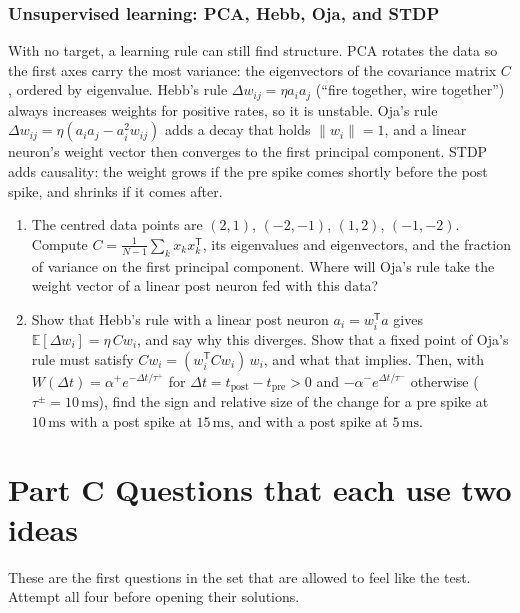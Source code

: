 \documentclass[11pt,letterpaper]{article}
\newcommand{\T}{\mathsf{T}}
\begin{document}
\section{Unsupervised learning: PCA, Hebb, Oja, and STDP}

\begin{idea}
With no target, a learning rule can still find structure. PCA rotates the data so the first axes carry the most variance: the eigenvectors of the covariance matrix $C$, ordered by eigenvalue. Hebb's rule $\Delta w_{ij} = \eta a_ia_j$ (``fire together, wire together'') always increases weights for positive rates, so it is unstable. Oja's rule $\Delta w_{ij} = \eta(a_ia_j - a_i^2 w_{ij})$ adds a decay that holds $\|w_i\| = 1$, and a linear neuron's weight vector then converges to the first principal component. STDP adds causality: the weight grows if the pre spike comes shortly before the post spike, and shrinks if it comes after.
\end{idea}

\begin{enumerate}
\item The centred data points are $(2, 1)$, $(-2, -1)$, $(1, 2)$, $(-1, -2)$. Compute $C = \frac{1}{N - 1}\sum_k x_kx_k^\T$, its eigenvalues and eigenvectors, and the fraction of variance on the first principal component. Where will Oja's rule take the weight vector of a linear post neuron fed with this data?
\item Show that Hebb's rule with a linear post neuron $a_i = w_i^\T a$ gives $\mathbb{E}[\Delta w_i] = \eta\,Cw_i$, and say why this diverges. Show that a fixed point of Oja's rule must satisfy $Cw_i = (w_i^\T Cw_i)\,w_i$, and what that implies. Then, with $W(\Delta t) = \alpha^+e^{-\Delta t/\tau^+}$ for $\Delta t = t_{\mathrm{post}} - t_{\mathrm{pre}} > 0$ and $-\alpha^-e^{\Delta t/\tau^-}$ otherwise ($\tau^\pm = 10\,\mathrm{ms}$), find the sign and relative size of the change for a pre spike at $10\,\mathrm{ms}$ with a post spike at $15\,\mathrm{ms}$, and with a post spike at $5\,\mathrm{ms}$.
\end{enumerate}

\part*{Part C \quad Questions that each use two ideas}

\begin{trythis}
These are the first questions in the set that are allowed to feel like the test. Attempt all four before opening their solutions.
\end{trythis}
\end{document}
